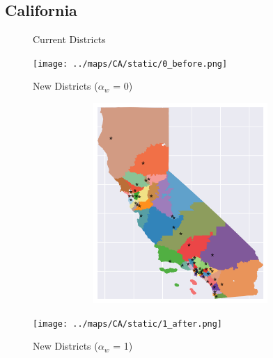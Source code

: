 \subsection{California}
\begin{figure}[htb!] \centering
\caption{ Current Districts }
\texttt{[image: ../maps/CA/static/0\_before.png]}
\caption{ New Districts ($\alpha_w$ = 0) }
\includegraphics[width=5in,height=3in,keepaspectratio]{../maps/CA/static/0_after.png}
\caption{ New Districts ($\alpha_w$ = 1) }
\texttt{[image: ../maps/CA/static/1\_after.png]}
\end{figure}

\clearpage
\newpage

